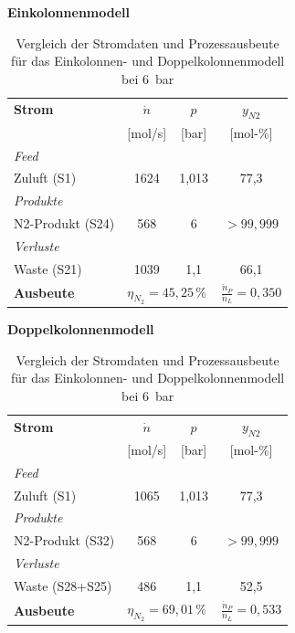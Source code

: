 \begin{table}[H]
\centering
\caption{Vergleich der Stromdaten und Prozessausbeute für das Einkolonnen- und Doppelkolonnenmodell bei \SI{6}{bar}}
\label{tab:stream_comparison_compact}
\vspace{1mm}
\begin{minipage}[t]{0.48\textwidth}
\centering
\textbf{Einkolonnenmodell} \\
\vspace{2mm}
\small
\begin{tabular}{lccc}
\hline
\textbf{Strom} & \textbf{$\dot{n}$} & \textbf{$p$} & \textbf{$y_{N2}$} \\
 & [mol/s] & [bar] & [mol-\%] \\ \hline
\textit{Feed} & & & \\
Zuluft (S1) & 1624 & 1,013 & 77,3 \\ \hline
\textit{Produkte} & & & \\
N2-Produkt (S24) & 568 & 6 & $> 99,999$ \\ \hline
\textit{Verluste} & & & \\
Waste (S21) & 1039 & 1,1 & 66,1 \\ \hline \hline
\textbf{Ausbeute} & \multicolumn{2}{l}{$\eta_{N_2} = 45,25\,\%$} & $\frac{\dot{n}_{P}}{\dot{n}_{L}} = 0,350$ \\ \hline
\end{tabular}
\end{minipage}
\hfill
\begin{minipage}[t]{0.48\textwidth}
\centering
\textbf{Doppelkolonnenmodell} \\
\vspace{2mm}
\small
\begin{tabular}{lccc}
\hline
\textbf{Strom} & \textbf{$\dot{n}$} & \textbf{$p$} & \textbf{$y_{N2}$} \\
 & [mol/s] & [bar] & [mol-\%] \\ \hline
\textit{Feed} & & & \\
Zuluft (S1) & 1065 & 1,013 & 77,3 \\ \hline
\textit{Produkte} & & & \\
N2-Produkt (S32) & 568 & 6 & $> 99,999$ \\ \hline
\textit{Verluste} & & & \\
Waste (S28+S25) & 486 & 1,1 & 52,5 \\ \hline \hline
\textbf{Ausbeute} & \multicolumn{2}{l}{$\eta_{N_2} = 69,01\,\%$} & $\frac{\dot{n}_{P}}{\dot{n}_{L}} = 0,533$ \\ \hline
\end{tabular}
\end{minipage}
\end{table}
